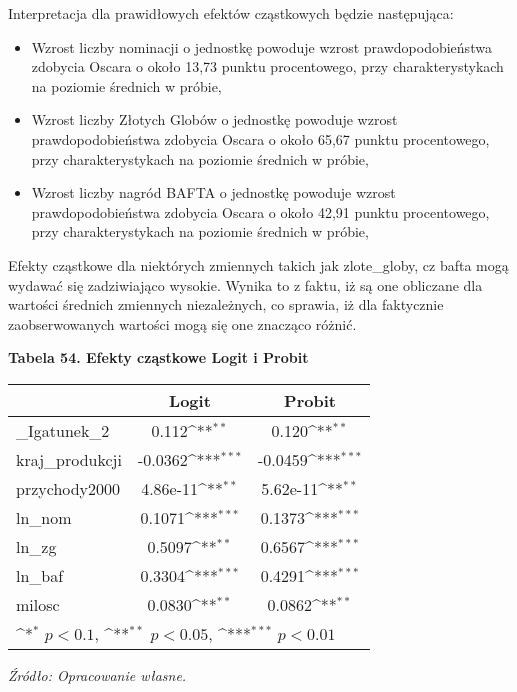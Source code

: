 Interpretacja dla prawidłowych efektów cząstkowych będzie następująca:

\begin{itemize}
\item Wzrost liczby nominacji o jednostkę powoduje wzrost prawdopodobieństwa zdobycia Oscara o około 13,73 punktu procentowego, przy charakterystykach na poziomie średnich w próbie, 
\item Wzrost liczby Złotych Globów o jednostkę powoduje wzrost prawdopodobieństwa zdobycia Oscara o około 65,67 punktu procentowego, przy charakterystykach na poziomie średnich w próbie,
\item Wzrost liczby nagród BAFTA o jednostkę powoduje wzrost prawdopodobieństwa zdobycia Oscara o około 42,91 punktu procentowego, przy charakterystykach na poziomie średnich w próbie,
\end{itemize}

Efekty cząstkowe dla niektórych zmiennych takich jak zlote_globy, cz bafta mogą wydawać się zadziwiająco wysokie. Wynika to z faktu, iż są one obliczane dla wartości średnich zmiennych niezależnych, co sprawia, iż dla faktycznie zaobserwowanych wartości mogą się one znacząco różnić. 

\vspace{0.5cm}
\textbf{Tabela 54. Efekty cząstkowe Logit i Probit}
{
\def\sym#1{\ifmmode^{#1}\else\(^{#1}\)\fi}
\begin{tabular}{l*{2}{c}}
\hline\hline
            &\multicolumn{1}{c}{Logit}&\multicolumn{1}{c}{Probit}\\
\hline
\_Igatunek\_2 &       0.112\sym{**}  &       0.120\sym{**}  \\
\addlinespace
kraj\_produkcji &     -0.0362\sym{***} &     -0.0459\sym{***} \\
\addlinespace
przychody2000&    4.86e-11\sym{**}  &    5.62e-11\sym{**}  \\
\addlinespace
ln\_nom      &       0.1071\sym{***}&       0.1373\sym{***}\\
\addlinespace
ln\_zg       &      0.5097\sym{**}  &       0.6567\sym{***} \\
\addlinespace
ln\_baf      &      0.3304\sym{***}&       0.4291\sym{***}\\
\addlinespace
milosc   &      0.0830\sym{**}  &      0.0862\sym{**}  \\
\hline\hline
\multicolumn{3}{l}{\footnotesize \sym{*} \(p<0.1\), \sym{**} \(p<0.05\), \sym{***} \(p<0.01\)}\\
\end{tabular}
}
\textit{\footnotesize{Źródło: Opracowanie własne.}} \\

